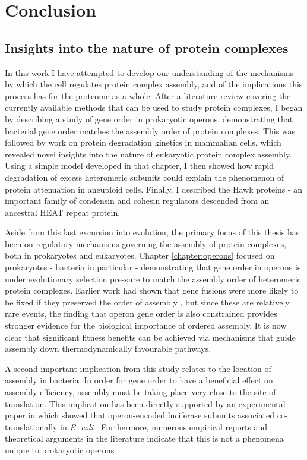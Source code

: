 \documentclass[a4paper,11pt,twoside,openright]{scrbook}
\begin{document}
\chapter{Conclusion}\label{chapter:conclusion}
\section{Insights into the nature of protein complexes}
In this work I have attempted to develop our understanding of the mechanisms by
which the cell regulates protein complex assembly, and of the implications this
process has for the proteome as a whole. After a literature review covering the
currently available methods that can be used to study protein complexes, I began
by describing a study of gene order in prokaryotic operons, demonstrating that
bacterial gene order matches the assembly order of protein complexes. This was
followed by work on protein degradation kinetics in mammalian cells, which
revealed novel insights into the nature of eukaryotic protein complex assembly.
Using a simple model developed in that chapter, I then showed how rapid
degradation of excess heteromeric subunits could explain the phenomenon of
protein attenuation in aneuploid cells. Finally, I described the Hawk proteins -
an important family of condensin and cohesin regulators descended from an
ancestral HEAT repeat protein.

Aside from this last excursion into evolution, the primary focus of this thesis
has been on regulatory mechanisms governing the assembly of protein complexes,
both in prokaryotes and eukaryotes. Chapter \ref{chapter:operons} focused on
prokaryotes - bacteria in particular - demonstrating that gene order in operons
is under evolutionary selection pressure to match the assembly order of
heteromeric protein complexes. Earlier work had shown that gene fusions were
more likely to be fixed if they preserved the order of assembly
\cite{Marsh2013}, but since these are relatively rare events, the finding that
operon gene order is also constrained provides stronger evidence for the
biological importance of ordered assembly. It is now clear that significant
fitness benefits can be achieved via mechanisms that guide assembly down
thermodynamically favourable pathways.

A second important implication from this study relates to the location of
assembly in bacteria. In order for gene order to have a beneficial effect on
assembly efficiency, assembly must be taking place very close to the site of
translation. This implication has been directly supported by an experimental
paper in which showed that operon-encoded luciferase subunits associated
co-translationally in \textit{E. coli} \cite{Shieh2015a}. Furthermore, numerous
empirical reports and theoretical arguments in the literature indicate that this
is not a phenomena unique to prokaryotic operons \cite{Wells2015,Natan2017}.
\end{document}
